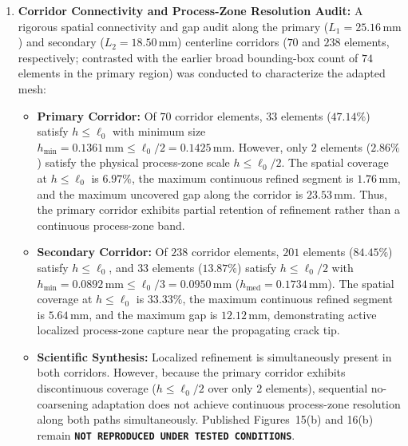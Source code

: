 \begin{enumerate}
  Because single-frame error recovery at State~4 captures only the actively propagating secondary crack while the severed primary wake relaxes, Task~F1701 evaluated sequential native remeshing using the existing Task~F1700 recovery databases (\texttt{PK\_SEC43\_PRESCRIBED\_STATE2.odb} and \texttt{STATE4.odb}) under the native control parameter \texttt{coarseningFactor = NOT\_ALLOWED}. In Pass~1, native \texttt{adaptiveRemesh()} refines the active primary notch corridor at State~2 ($8{,}363$ elements). In Pass~2, the remesher takes the Pass~1 mesh as donor and adapts it to the State~4 recovery field with coarsening disallowed. This generated the physical adapted mesh \texttt{PK\_SEC43\_F1701\_HISTORY\_AWARE\_ADAPT.inp} ($10{,}597$ elements, $10{,}675$ nodes, $96.54\%$ quads, $3.46\%$ triangles, preserving specimen CAD area to $100.0007\%$).
  \item \textbf{Corridor Connectivity and Process-Zone Resolution Audit:}
  A rigorous spatial connectivity and gap audit along the primary ($L_1 = 25.16\,\mathrm{mm}$) and secondary ($L_2 = 18.50\,\mathrm{mm}$) centerline corridors ($70$ and $238$ elements, respectively; contrasted with the earlier broad bounding-box count of $74$ elements in the primary region) was conducted to characterize the adapted mesh:
  \begin{itemize}
    \item \textbf{Primary Corridor:} Of $70$ corridor elements, $33$ elements ($47.14\%$) satisfy $h \le \ell_0$ with minimum size $h_{\min} = 0.1361\,\mathrm{mm} \le \ell_0/2 = 0.1425\,\mathrm{mm}$. However, only $2$ elements ($2.86\%$) satisfy the physical process-zone scale $h \le \ell_0/2$. The spatial coverage at $h \le \ell_0$ is $6.97\%$, the maximum continuous refined segment is $1.76\,\mathrm{mm}$, and the maximum uncovered gap along the corridor is $23.53\,\mathrm{mm}$. Thus, the primary corridor exhibits partial retention of refinement rather than a continuous process-zone band.
    \item \textbf{Secondary Corridor:} Of $238$ corridor elements, $201$ elements ($84.45\%$) satisfy $h \le \ell_0$, and $33$ elements ($13.87\%$) satisfy $h \le \ell_0/2$ with $h_{\min} = 0.0892\,\mathrm{mm} \le \ell_0/3 = 0.0950\,\mathrm{mm}$ ($h_{\mathrm{med}} = 0.1734\,\mathrm{mm}$). The spatial coverage at $h \le \ell_0$ is $33.33\%$, the maximum continuous refined segment is $5.64\,\mathrm{mm}$, and the maximum gap is $12.12\,\mathrm{mm}$, demonstrating active localized process-zone capture near the propagating crack tip.
    \item \textbf{Scientific Synthesis:} Localized refinement is simultaneously present in both corridors. However, because the primary corridor exhibits discontinuous coverage ($h \le \ell_0/2$ over only $2$ elements), sequential no-coarsening adaptation does not achieve continuous process-zone resolution along both paths simultaneously. Published Figures~15(b) and 16(b) remain \textbf{\texttt{NOT REPRODUCED UNDER TESTED CONDITIONS}}.
  \end{itemize}
\end{enumerate}


